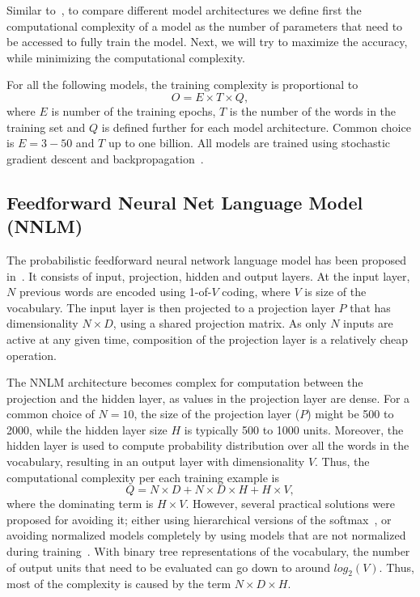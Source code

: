 \documentclass{article} %
\begin{document}
Similar to~\cite{ASRU}, to compare different model architectures we define first the computational complexity of a model as the number of parameters that need to be accessed to fully train the model. Next, we will
try to maximize the accuracy, while minimizing the computational complexity.

For all the following models, the training complexity is proportional to
\begin{equation}
O = E \times T \times Q,
\end{equation}
where $E$ is number of the training epochs, $T$ is the number of the words in the training set and $Q$ is defined further for each model architecture. Common choice is $E = 3 - 50$ and $T$ up to one billion.
All models are trained using stochastic gradient descent and backpropagation~\cite{BPTT}.

\subsection{Feedforward Neural Net Language Model (NNLM)}


The probabilistic feedforward neural network language model has been proposed in~\cite{Bengio}. It consists of input, projection, hidden and output layers. At the input layer, $N$ previous words are encoded
using 1-of-$V$ coding, where $V$ is size of the vocabulary. The input layer is then projected to a projection layer $P$ that has dimensionality $N \times D$, using a shared projection matrix. As only $N$ inputs are
active at any given time, composition of the projection layer is a relatively cheap operation.

The NNLM architecture becomes complex for computation between the projection and the hidden layer, as values in the projection layer are dense.
For a common choice of $N = 10$, the size of the projection layer ($P$) might be 500 to 2000, while the hidden layer size $H$ is typically 500 to 1000 units. Moreover, the hidden layer is used to compute probability
distribution over all the words in the vocabulary, resulting in an output layer with dimensionality $V$. Thus, the computational complexity per each training example is
\begin{equation}
Q = N \times D + N \times D \times H + H \times V,
\end{equation}
where the dominating term is $H \times V$. However, several practical solutions were proposed for avoiding it; either using hierarchical versions of the softmax~\cite{Morin, Mnih, ASRU}, or avoiding
normalized models completely by using models that are not normalized during training~\cite{Collobert1, Huang}. With binary tree representations of the vocabulary, the number of output units that need to be evaluated
can go down to around $log_{2}(V)$. Thus, most of the complexity is caused by the term $N \times D \times H$.
\end{document}

